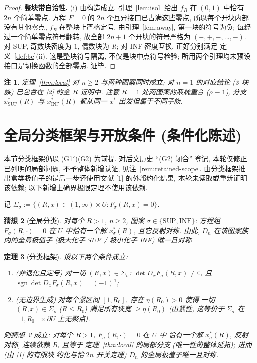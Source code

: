 \documentclass[UTF8]{ctexart}
\newtheorem{theorem}{定理}[section]
\newtheorem{remark}[theorem]{注}
\newtheorem{conjecture}[theorem]{猜想}
\begin{document}
\begin{proof}
\textbf{整块带自洽性.} (i) 由构造成立. 引理~\ref{lem:isol} 给出 $f_R$ 在
$(0,1)$ 中恰有 $2n$ 个简单零点. 方程 $F=0$ 的 $2n$ 个互异接口已占满这些零点,
所以每个开块内部没有其他零点, $f_R$ 在整块上严格定号.
由引理~\ref{lem:away}, 第一块的符号为负; 每经过一个简单零点符号翻转,
故全部 $2n+1$ 个开块的符号严格为 $(-,+,-,\dots,-)$.
对 SUP, 奇数块密度为 $1$, 偶数块为 $R$; 对 INF 密度互换, 正好分别满足
定义~\ref{def:bc}(ii). 这是整块符号隔离, 不仅是块中点符号检验;
所用两个引理均未预设接口是切换函数的全部零点. 证毕.
\end{proof}

\begin{remark}
定理~\ref{thm:local} 对 $n\ge2$ 与两种图案同时成立; 对 $n=1$ 的对应结论
(3 块族) 已包含在 [2] 的全 $R$ 证明中. 注意 $R=1$ 处两图案的系统重合
($\rho\equiv1$), 分支 $x_\mathrm{SUP}^*(R)$ 与 $x_\mathrm{INF}^*(R)$ 都从同一
$x^*$ 出发但属于不同子族.
\end{remark}

\section{全局分类框架与开放条件 (条件化陈述)}\label{sec:global}

本节分类框架仍以 (G1$'$)(G2) 为前提. 对后文历史 ``(G2) 闭合'' 登记,
本轮仅修正已列明的局部问题, 不予整体新增认证, 见注~\ref{rem:retained-scope}.
由分类框架推出盒类极值子的最后一步还使用文献 [1] 的外部约化结果,
本轮未读取或重新证明该依赖; 以下新增上确界极限定理不使用该依赖.

记 $\Sigma_\sigma:=\{(R,x)\in(1,\infty)\times U: F_\sigma(R,x)=0\}$.

\begin{conjecture}[全局分类]\label{conj:global}
对每个 $R>1$, $n\ge2$, 图案 $\sigma\in\{\mathrm{SUP},\mathrm{INF}\}$:
方程组 $F_\sigma(R,\cdot)=0$ 在 $U$ 中恰有一个解 $x_\sigma^*(R)$, 且它反射对称.
由此, $D_n$ 在该图案族内的全局极值子 (极大化子 SUP / 极小化子 INF) 唯一且对称.
\end{conjecture}

\begin{theorem}[分类框架]\label{thm:framework}
设以下两个条件成立:
\begin{enumerate}
	\item[(G1$'$)] (非退化且定号) 对一切 $(R,x)\in\Sigma_\sigma$:
	$\det D_xF_\sigma(R,x)\neq0$, 且 $\operatorname{sgn}\det D_xF_\sigma(R,x)=(-1)^n$;
	\item[(G2)] (无边界生成) 对每个紧区间 $[1,R_0]$, 存在 $\eta(R_0)>0$ 使得
	一切 $(R,x)\in\Sigma_\sigma$ ($R\le R_0$) 满足所有块宽 $\ge\eta(R_0)$
	(由紧性, 这等价于 $\Sigma_\sigma$ 在 $[1,R_0]\times\partial U$ 上无聚点).
\end{enumerate}
则猜想~\ref{conj:global} 成立: 对每个 $R>1$, $F_\sigma(R,\cdot)=0$ 在 $U$ 中
恰有一个解 $x_\sigma^*(R)$, 反射对称, 连续依赖 $R$, 且等于
定理~\ref{thm:local} 的局部分支 (唯一性的整体延拓); 进而 (由 [1] 的有限块
约化与恰 $2n$ 开关定理) $D_n$ 的全局极值子唯一且对称.
\end{theorem}
\end{document}
